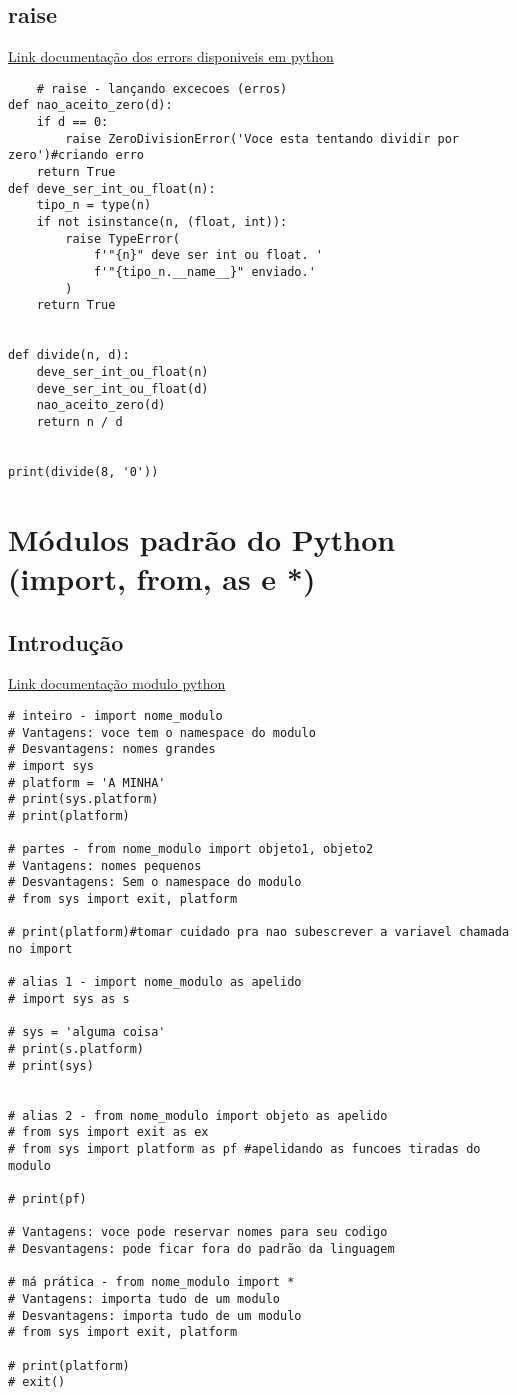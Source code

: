 \documentclass{article}
\begin{document}
\subsection{raise}
\href{https://docs.python.org/pt-br/3/library/exceptions.html#built-in-exceptions}{Link documentação dos errors disponiveis em python}
\begin{lstlisting}
    # raise - lançando excecoes (erros)
def nao_aceito_zero(d):
    if d == 0:
        raise ZeroDivisionError('Voce esta tentando dividir por zero')#criando erro
    return True
def deve_ser_int_ou_float(n):
    tipo_n = type(n)
    if not isinstance(n, (float, int)):
        raise TypeError(
            f'"{n}" deve ser int ou float. '
            f'"{tipo_n.__name__}" enviado.'
        )
    return True


def divide(n, d):
    deve_ser_int_ou_float(n)
    deve_ser_int_ou_float(d)
    nao_aceito_zero(d)
    return n / d


print(divide(8, '0'))   
\end{lstlisting}   
\section{ Módulos padrão do Python (import, from, as e *)}
\subsection{Introdução}
\href{https://docs.python.org/3/py-modindex.html}{Link documentação modulo python}
\begin{lstlisting}
# inteiro - import nome_modulo
# Vantagens: voce tem o namespace do modulo
# Desvantagens: nomes grandes
# import sys
# platform = 'A MINHA'
# print(sys.platform)
# print(platform)

# partes - from nome_modulo import objeto1, objeto2
# Vantagens: nomes pequenos
# Desvantagens: Sem o namespace do modulo
# from sys import exit, platform

# print(platform)#tomar cuidado pra nao subescrever a variavel chamada no import

# alias 1 - import nome_modulo as apelido
# import sys as s

# sys = 'alguma coisa'
# print(s.platform)
# print(sys)


# alias 2 - from nome_modulo import objeto as apelido
# from sys import exit as ex
# from sys import platform as pf #apelidando as funcoes tiradas do modulo

# print(pf)

# Vantagens: voce pode reservar nomes para seu codigo
# Desvantagens: pode ficar fora do padrão da linguagem

# má prática - from nome_modulo import *
# Vantagens: importa tudo de um modulo
# Desvantagens: importa tudo de um modulo
# from sys import exit, platform

# print(platform)
# exit()
\end{lstlisting}   
\end{document}
